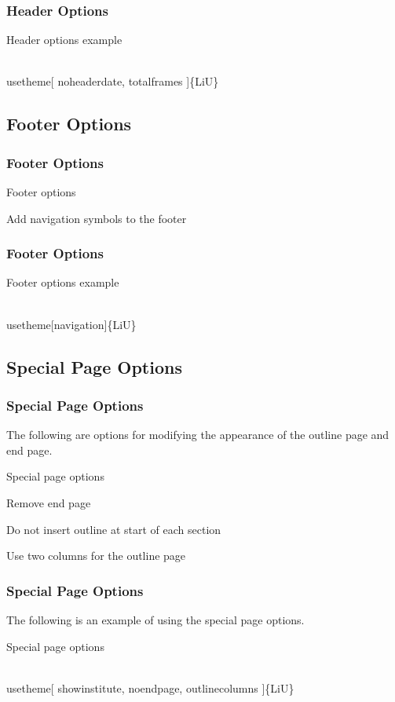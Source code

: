 \documentclass[noamsthm, english]{beamer}%
\newenvironment{codeblock}[1][Example Code]
    {\begin{block}{#1}\footnotesize\vspace{-1em}\begin{semiverbatim}}%
    {\end{semiverbatim}\vspace{-1em}\end{block}}%
\begin{document}
\begin{frame}[fragile]
\frametitle{Header Options}
\begin{codeblock}[Header options example]
\\usetheme[%
\hspace{1em}noheaderdate,%
\hspace{1em}totalframes%
]\{LiU\}
\end{codeblock}
\end{frame}

\subsection{Footer Options}

\begin{frame}
\frametitle{Footer Options}
\begin{block}{Footer options}
\centering \footnotesize
\begin{description}[navigation]
\item[navigation] Add navigation symbols to the footer
\end{description}
\end{block}
\end{frame}

\begin{frame}[fragile]
\frametitle{Footer Options}
\begin{codeblock}[Footer options example]
\\usetheme[navigation]\{LiU\}
\end{codeblock}
\end{frame}

\subsection{Special Page Options}

\begin{frame}
\frametitle{Special Page Options}
The following are options for modifying the appearance of the outline page and end page.
\begin{block}{Special page options}
\centering \footnotesize
\begin{description}[noheadernumber]
\item[noendpage] Remove end page
\item[nooutline] Do not insert outline at start of each section
\item[outlinecolumns] Use two columns for the outline page
\end{description}
\end{block}
\end{frame}

\begin{frame}[fragile]
\frametitle{Special Page Options}
The following is an example of using the special page options.
\begin{codeblock}[Special page options]
\\usetheme[%
\hspace{1em}showinstitute,%
\hspace{1em}noendpage,%
\hspace{1em}outlinecolumns%
]\{LiU\}
\end{codeblock}
\end{frame}
\end{document}
